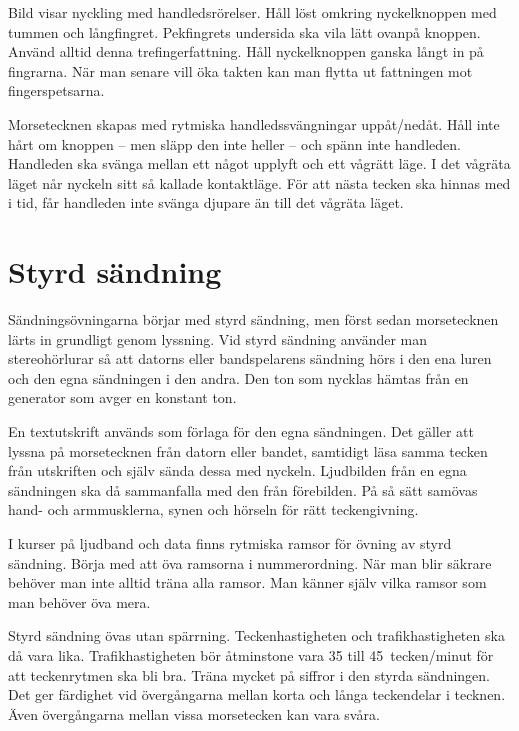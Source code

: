 
Bild  visar nyckling med handledsrörelser.
Håll löst omkring nyckelknoppen med tummen och långfingret.
Pekfingrets undersida ska vila lätt ovanpå knoppen.
Använd alltid denna trefingerfattning.
Håll nyckelknoppen ganska långt in på fingrarna.
När man senare vill öka takten kan man flytta ut fattningen mot fingerspetsarna.

Morsetecknen skapas med rytmiska handledssvängningar uppåt/nedåt.
Håll inte hårt om knoppen -- men släpp den inte heller -- och spänn inte
handleden.
Handleden ska svänga mellan ett något upplyft och ett vågrätt läge.
I det vågräta läget når nyckeln sitt så kallade kontaktläge.
För att nästa tecken ska hinnas med i tid, får handleden inte svänga djupare än
till det vågräta läget.

\section{Styrd sändning}

Sändningsövningarna börjar med styrd sändning, men först sedan morsetecknen
lärts in grundligt genom lyssning.
Vid styrd sändning använder man stereohörlurar så att datorns eller
bandspelarens sändning hörs i den ena luren och den egna sändningen i den andra.
Den ton som nycklas hämtas från en generator som avger en konstant ton.

En textutskrift används som förlaga för den egna sändningen.
Det gäller att lyssna på morsetecknen från datorn eller bandet, samtidigt läsa
samma tecken från utskriften och själv sända dessa med nyckeln.
Ljudbilden från en egna sändningen ska då sammanfalla med den från förebilden.
På så sätt samövas hand- och armmusklerna, synen och hörseln för rätt
teckengivning.

I kurser på ljudband och data finns rytmiska ramsor för övning av styrd
sändning.
Börja med att öva ramsorna i nummerordning.
När man blir säkrare behöver man inte alltid träna alla ramsor.
Man känner själv vilka ramsor som man behöver öva mera.

Styrd sändning övas utan spärrning.
Teckenhastigheten och trafikhastigheten ska då vara lika.
Trafikhastigheten bör åtminstone vara 35 till 45~tecken/minut för att
teckenrytmen ska bli bra.
Träna mycket på siffror i den styrda sändningen.
Det ger färdighet vid övergångarna mellan korta och långa teckendelar i tecknen.
Även övergångarna mellan vissa morsetecken kan vara svåra.

